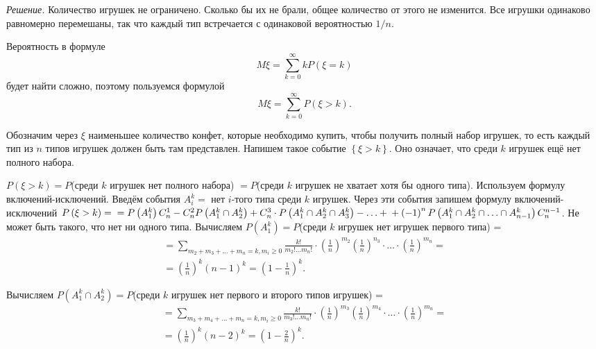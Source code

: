 \textit{Решение.} Количество игрушек не ограничено.
Сколько бы их не брали, общее количество от этого не изменится.
Все игрушки одинаково равномерно перемешаны, так что каждый тип встречается с одинаковой вероятностью $1/n$.

Вероятность в формуле 
$$M \xi =
\sum \limits_{k=0}^{ \infty } kP \left( \xi = k \right) $$
будет найти сложно, поэтому пользуемся формулой
$$M \xi =
\sum \limits_{k=0}^{ \infty } P \left( \xi > k \right).$$

Обозначим через $ \xi $ наименьшее количество конфет, которые необходимо купить, чтобы получить полный набор игрушек,
то есть каждый тип из $n$ типов игрушек должен быть там представлен. 
Напишем такое событие $ \left\{ \xi > k \right\} $.
Оно означает, что среди $k$ игрушек ещё нет полного набора.

$P \left( \xi > k \right) = P$(среди $k$ игрушек нет полного набора) $= P$(среди $k$ игрушек не хватает хотя бы одного типа).
Используем формулу включений-исключений.
Введём события $A_i^k =$ {нет $i$-того типа среди $k$ игрушек}.
Через эти события запишем формулу включений-исключений
$P \left( \xi > k \right) = \\
= P \left( A_1^k \right) C_n^1 -
C_n^2 P \left( A_1^k \cap A_2^k \right) +
C_n^3 \cdot P \left( A_1^k \cap A_2^k \cap A_3^k \right) -
\dotsc + \\
+ \left( -1 \right)^n P \left( A_1^k \cap A_2^k \cap \dotsc \cap A_{n-1}^k \right) C_n^{n-1}$.
Не может быть такого, что нет ни одного типа.
Вычисляем $P \left( A_1^k \right) = P$(среди $k$ игрушек нет игрушек первого типа) =
\begin{equation*}
\begin{split}
= \sum \limits_{m_2 + m_3 + \dotsc + m_n = k, m_i \geq 0} \frac{k!}{m_2! \dotsc m_n!} \cdot \left( \frac{1}{n} \right)^{m_2} \left( \frac{1}{n} \right)^{n_3} \cdot \dotsc \cdot \left( \frac{1}{n} \right)^{m_n} = \\
= \left( \frac{1}{n} \right)^k \left( n-1 \right)^k =
\left( 1 - \frac{1}{n} \right)^k.
\end{split}
\end{equation*}

Вычисляем $P \left( A_1^k \cap A_2^k \right) = P$(среди $k$ игрушек нет первого и второго типов игрушек) =
\begin{equation*}
\begin{split}
= \sum \limits_{m_3 + m_4 + \dotsc + m_n = k, m_i \geq 0} \frac{k!}{m_3! \dotsc m_n!} \cdot
\left( \frac{1}{n} \right)^{m_3} \left( \frac{1}{n} \right)^{m_4} \cdot \dotsc \cdot \left( \frac{1}{n} \right)^{m_n} = \\
= \left( \frac{1}{n} \right)^k \left( n-2 \right)^k =
\left( 1 - \frac{2}{n} \right)^k.
\end{split}
\end{equation*}

